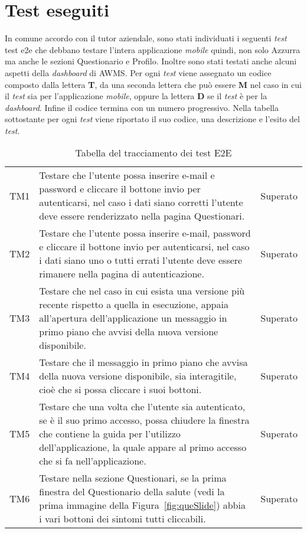 \section{Test eseguiti}
In comune accordo con il tutor aziendale, sono stati individuati i seguenti \emph{test} \gls{test e2e} che debbano testare l'intera applicazione \emph{mobile} quindi, non solo Azzurra ma anche le sezioni Questionario e Profilo. Inoltre sono stati testati anche alcuni aspetti della \emph{dashboard} di \gls{AWMS}. Per ogni \emph{test} viene assegnato un codice composto dalla lettera \textbf{T}, da una seconda lettera che può essere \textbf{M} nel caso in cui il \emph{test} sia per l'applicazione \emph{mobile}, oppure la lettera \textbf{D} se il \emph{test} è per la \emph{dashboard}. Infine il codice termina con un numero progressivo. Nella tabella sottostante per ogni \emph{test} viene riportato il suo codice, una descrizione e l'esito del \emph{test}.
\begin{table}[h]%
	\centering
	\begin{tabularx}{\textwidth}{c X c}
		\hline	
		\rowcolor{giallo}
		\intest{Codice} &  \intest{Descrizione} & \intest{Esito}\\	
		\hline			
		TM1 & Testare che l'utente possa inserire e-mail e password e cliccare il bottone invio per autenticarsi, nel caso i dati siano corretti l'utente deve essere renderizzato nella pagina Questionari. & Superato\\
		TM2 & Testare che l'utente possa inserire e-mail, password e cliccare il bottone invio per autenticarsi, nel caso i dati siano uno o tutti errati l'utente deve essere rimanere nella pagina di autenticazione. & Superato\\
		TM3 & Testare che nel caso in cui esista una versione più recente rispetto a quella in esecuzione, appaia all'apertura dell'applicazione un messaggio in primo piano che avvisi della nuova versione disponibile. & Superato\\
		TM4 & Testare che il messaggio in primo piano che avvisa della nuova versione disponibile, sia interagitile, cioè che si possa cliccare i suoi bottoni. & Superato\\
		TM5 & Testare che una volta che l'utente sia autenticato, se è il suo primo accesso, possa chiudere la finestra che contiene la guida per l'utilizzo dell'applicazione, la quale appare al primo accesso che si fa nell'applicazione. & Superato\\
		TM6 & Testare nella sezione Questionari, se la prima finestra del Questionario della salute (vedi la prima immagine della Figura~\ref{fig:queSlide}) abbia i vari bottoni dei sintomi tutti cliccabili. & Superato\\
		\hline
	\end{tabularx} \hbox{}
	\caption{Tabella del tracciamento dei test E2E}
\end{table}%

